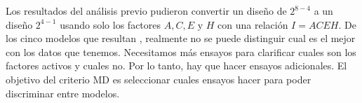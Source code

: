 

Los resultados del análisis previo pudieron convertir un diseño de $2^{8-4}$ a un diseño $2^{4-1}$ usando solo los factores $A, C, E \text{ y } H$ con una relación $I = ACEH$. De los cinco modelos que resultan , realmente no se puede distinguir cual es el mejor con los datos que tenemos. Necesitamos más ensayos para clarificar cuales son los factores activos y cuales no. Por lo tanto, hay que hacer ensayos adicionales. El objetivo del criterio MD es seleccionar cuales ensayos hacer para poder discriminar entre modelos.  


